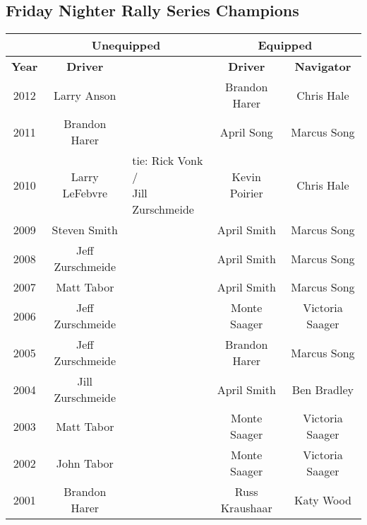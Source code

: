 \subsection{Friday Nighter Rally Series Champions}
{
\scriptsize
\begin{tabular}{|c|c|p{3cm}|c|c|}
\hline
 & \multicolumn{2}{|c|}{Unequipped} & \multicolumn{2}{|c|}{Equipped} \\
\hline
\textbf{Year} & \textbf{Driver} & \centering{\textbf{Navigator}} & \textbf{Driver} & \textbf{Navigator} \\
\hline
2012 & Larry Anson & \centering{Fran Hanchek} & Brandon Harer & Chris Hale \\
\hline
2011 & Brandon Harer & \centering{Markus Gattman} & April Song & Marcus Song \\
\hline
2010 & Larry LeFebvre & \centering{tie: Rick Vonk /\newline Jill Zurschmeide} & Kevin Poirier & Chris Hale \\
\hline
2009 & Steven Smith & \centering{John Masterman} & April Smith & Marcus Song \\
\hline
2008 & Jeff Zurschmeide & \centering{Jill Zurschmeide} & April Smith & Marcus Song \\
\hline
2007 & Matt Tabor & \centering{Marcus Gattman} & April Smith & Marcus Song \\
\hline
2006 & Jeff Zurschmeide & \centering{Jill Zurschmeide} & Monte Saager & Victoria Saager \\
\hline
2005 & Jeff Zurschmeide & \centering{Jill Zurschmeide} & Brandon Harer & Marcus Song \\
\hline
2004 & Jill Zurschmeide & \centering{Jeff Zurschmeide} & April Smith & Ben Bradley \\
\hline
2003 & Matt Tabor & \centering{Marcus Gattman} & Monte Saager & Victoria Saager \\
\hline
2002 & John Tabor & \centering{Darlene Tabor} & Monte Saager & Victoria Saager \\
\hline
2001 & Brandon Harer & \centering{Jennifer McGrew} & Russ Kraushaar & Katy Wood \\
\hline
\end{tabular}
}
